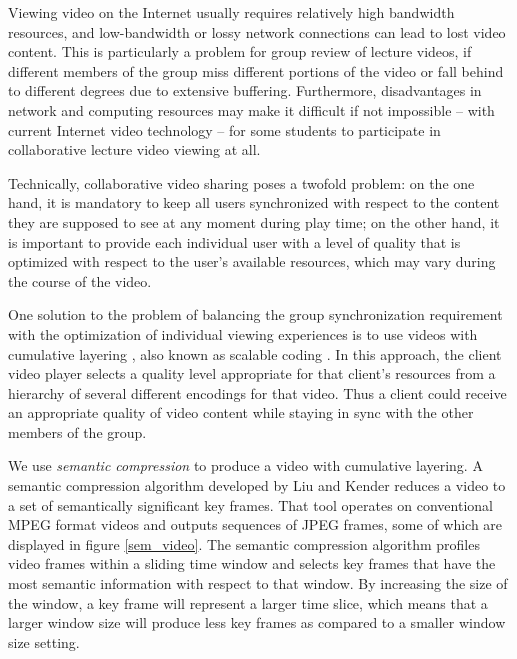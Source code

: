 \documentclass{sig-alternate}
\begin{document}
Viewing video on the Internet usually requires relatively high
bandwidth resources, and low-bandwidth or lossy network connections
can lead to lost video content.  This is particularly a problem for
group review of lecture videos, if different members of the group miss
different portions of the video or fall behind to different degrees
due to extensive buffering.  Furthermore, disadvantages in network and
computing resources may make it difficult if not impossible -- with
current Internet video technology -- for some students to participate
in collaborative lecture video viewing at all.

Technically, collaborative video sharing poses a twofold problem: on
the one hand, it is mandatory to keep all users synchronized with
respect to the content they are supposed to see at any moment during
play time; on the other hand, it is important to provide each
individual user with a level of quality that is optimized with respect
to the user's available resources, which may vary during the course of
the video.

One solution to the problem of balancing the group synchronization
requirement with the optimization of individual viewing experiences is
to use videos with cumulative layering \cite{MCCANNE}, also known as
scalable coding \cite{LI}.  In this approach, the client video player
selects a quality level appropriate for that client's resources from a
hierarchy of several different encodings for that video. Thus a client
could receive an appropriate quality of video content while staying in
sync with the other members of the group.



We use {\em semantic compression} to produce a video with cumulative
layering.  A semantic compression algorithm developed by Liu and
Kender \cite{TIECHENG} reduces a video to a set of semantically
significant key frames.  That tool operates on conventional MPEG
format videos and outputs sequences of JPEG frames, some of which are
displayed in figure \ref{sem_video}.  The semantic compression
algorithm profiles video frames within a sliding time window and
selects key frames that have the most semantic information with
respect to that window.  By increasing the size of the window, a key
frame will represent a larger time slice, which means that a larger
window size will produce less key frames as compared to a smaller
window size setting.
\end{document}
